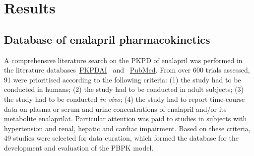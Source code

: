 \section{Results}\label{sec:Results}\justifying{}
\subsection{Database of enalapril pharmacokinetics}
A comprehensive literature search on the PKPD of enalapril was performed in the literature databases~\href{https://www.pkpdai.com/}{PKPDAI}~\cite{GonzalezHernandez2021} and ~\href{https://pubmed.ncbi.nlm.nih.gov/}{PubMed}. From over 600 trials assessed, 91 were prioritised according to the following criteria: (1) the study had to be conducted in humans; (2) the study had to be conducted in adult subjects; (3) the study had to be conducted \textit{in vivo}; (4) the study had to report time-course data on plasma or serum and urine concentrations of enalapril and/or its metabolite enalaprilat. Particular attention was paid to studies in subjects with hypertension and renal, hepatic and cardiac impairment. Based on these criteria, 49 studies were selected for data curation, which formed the database for the development and evaluation of the PBPK model. 
